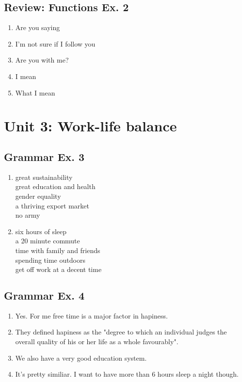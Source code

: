 \documentclass[12pt, a4paper, oneside]{article}
\begin{document}
  \subsection{Review: Functions Ex. 2}
  \begin{enumerate}[1.]
    \item Are you saying
    \item I'm not sure if I follow you
    \item Are you with me?
    \item I mean
    \item What I mean
  \end{enumerate}

  \newpage
  \section{Unit 3: Work-life balance}
  \subsection{Grammar Ex. 3}
  \begin{enumerate}[1.]
    \item great sustainability \\
    great education and health \\
    gender equality \\
    a thriving export market \\
    no army
    \item six hours of sleep \\
    a 20 minute commute \\
    time with family and friends \\
    spending time outdoors \\
    get off work at a decent time
  \end{enumerate}

  \subsection{Grammar Ex. 4}
  \begin{enumerate}[1.]
    \item Yes. For me free time is a major factor in hapiness.
    \item They defined hapiness as the "degree to which an individual judges the overall quality of his or her life as a whole favourably".
    \item We also have a very good education system.
    \item It's pretty similiar. I want to have more than 6 hours sleep a night though.
  \end{enumerate}
\end{document}

